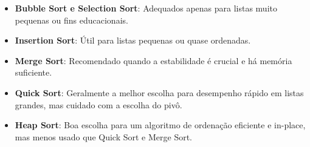 \documentclass[tcc2]{uftex}
\begin{document}
\begin{itemize}
    \item \textbf{Bubble Sort e Selection Sort}: Adequados apenas para listas muito pequenas ou fins educacionais.
    \item \textbf{Insertion Sort}: Útil para listas pequenas ou quase ordenadas.
    \item \textbf{Merge Sort}: Recomendado quando a estabilidade é crucial e há memória suficiente.
    \item \textbf{Quick Sort}: Geralmente a melhor escolha para desempenho rápido em listas grandes, mas cuidado com a escolha do pivô.
    \item \textbf{Heap Sort}: Boa escolha para um algoritmo de ordenação eficiente e in-place, mas menos usado que Quick Sort e Merge Sort.
\end{itemize}
\end{document}
